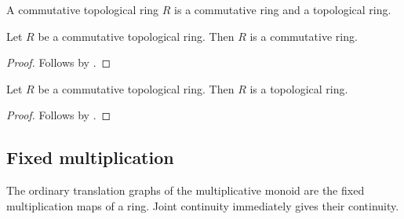\begin{struct}\label{commutative_topological_ring}
    A commutative topological ring $R$ is a commutative ring and a
    topological ring.
\end{struct}

\begin{classification}\label{commutative_topological_ring_is_commutative_ring}
    Let $R$ be a commutative topological ring.
    Then $R$ is a commutative ring.
\end{classification}
\begin{proof}
    Follows by .
\end{proof}

\begin{classification}\label{commutative_topological_ring_is_topological_ring}
    Let $R$ be a commutative topological ring.
    Then $R$ is a topological ring.
\end{classification}
\begin{proof}
    Follows by .
\end{proof}

\subsection{Fixed multiplication}

The ordinary translation graphs of the multiplicative monoid are the fixed
multiplication maps of a ring.  Joint continuity immediately gives their
continuity.

